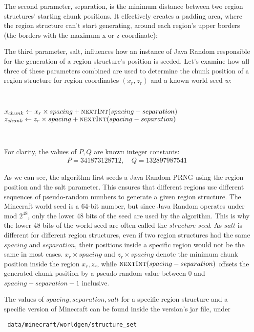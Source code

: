 \documentclass{article}
\begin{document}
The second parameter, separation, is the minimum distance between two region structures' starting chunk positions. It effectively creates a padding area, where the region structure can't start generating, around each region's upper borders (the borders with the maximum x or z coordinate):

The third parameter, salt, influences how an instance of Java Random responsible for the generation of a region structure's position is seeded. 
Let's examine how all three of these parameters combined are used to determine the chunk position of a region structure for region coordinates $(x_r, z_r)$ and a known world seed $w$:

\
\begin{algorithmic}
\State {}
\State $x_{chunk} \gets x_r \times spacing + \Call{nextInt}{spacing - separation}$
\State $z_{chunk} \gets z_r \times spacing + \Call{nextInt}{spacing - separation}$
\end{algorithmic}
\ \

\noindent For clarity, the values of $P, Q$ are known integer constants:
\begin{align*}
    P = 341873128712, \quad Q = 132897987541
\end{align*}

As we can see, the algorithm first seeds a Java Random PRNG using the region position and the salt parameter. This ensures that different regions use different sequences of pseudo-random numbers to generate a given region structure. The Minecraft world seed is a 64-bit number, but since Java Random operates under mod $2^{48}$, only the lower 48 bits of the seed are used by the algorithm. This is why the lower 48 bits of the world seed are often called the \emph{structure seed}. As $salt$ is different for different region structures, even if two region structures had the same $spacing$ and $separation$, their positions inside a specific region would not be the same in most cases.
$x_r \times spacing$ and $z_r \times spacing$ denote the minimum chunk position inside the region $x_r, z_r$, while $\Call{nextInt}{spacing - separation}$ offsets the generated chunk position by a pseudo-random value between 0 and $spacing - separation - 1$ inclusive.

The values of $spacing, separation, salt$ for a specific region structure and a specific version of Minecraft can be found inside the version's jar file, under 
\begin{verbatim} data/minecraft/worldgen/structure_set \end{verbatim}
\end{document}
